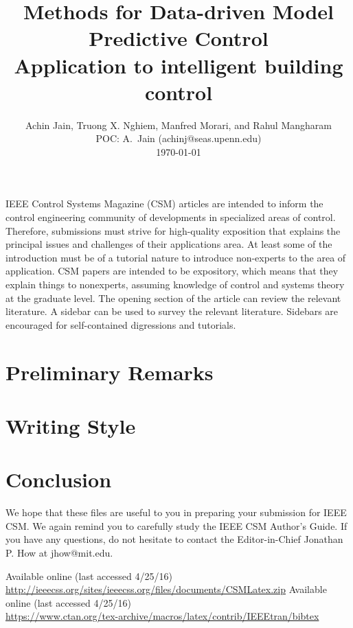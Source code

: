 \documentclass[letterpaper,12pt,peerreviewca,draftcls]{IEEEtran}
\title{\huge Methods for Data-driven Model Predictive Control\\
\Large Application to intelligent building control}
\author{Achin Jain, Truong X. Nghiem, Manfred Morari, and Rahul Mangharam \\
	POC: A.\ Jain (achinj@seas.upenn.edu)\\ \today }
\begin{document}
\maketitle
\CSMsetup
\linenumbers \modulolinenumbers[2] %

IEEE Control Systems Magazine (CSM) articles are intended to inform the control engineering community of developments in specialized areas of control. Therefore, submissions must strive for high-quality exposition that explains the principal issues and challenges of their applications area. At least some of the introduction must be of a tutorial nature to introduce non-experts to the area of application. CSM papers are intended to be expository, which means that they explain things to nonexperts, assuming knowledge of control and systems theory at the graduate level. The opening section of the article can review the relevant literature. 
A sidebar can be used to survey the relevant literature. Sidebars are encouraged for self-contained digressions and tutorials.

\section{Preliminary Remarks}
%
%
%
%
%
\section{Writing Style}
%

\section{Conclusion}
We hope that these files are useful to you in preparing your submission for IEEE CSM. We again remind you to carefully study the IEEE CSM Author’s Guide. If you have any questions, do not hesitate to contact the Editor-in-Chief Jonathan P. How at jhow@mit.edu.

%
%
\begin{thebibliography}{10}
 Available online (last accessed 4/25/16)\\ \url{http://ieeecss.org/sites/ieeecss.org/files/documents/CSMLatex.zip}	
 Available online (last accessed 4/25/16)\\ \url{https://www.ctan.org/tex-archive/macros/latex/contrib/IEEEtran/bibtex}
\end{thebibliography}
\end{document}
